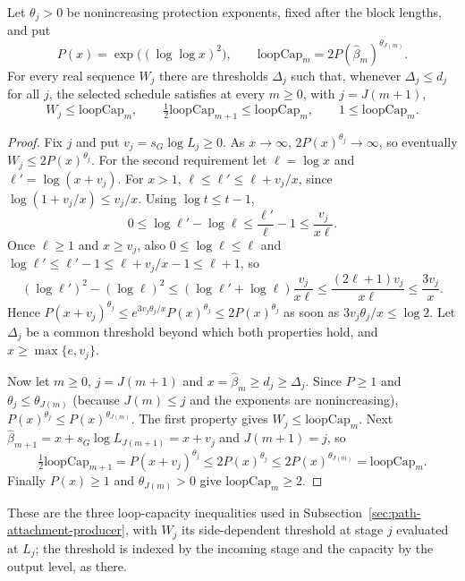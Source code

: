\begin{lemma}\label{lem:common-loop-capacity}
Let $\theta_j>0$ be nonincreasing protection exponents, fixed
after the block lengths, and put
\[
 P(x)=\exp\bigl((\log\log x)^2\bigr),\qquad
 \mathrm{loopCap}_m=2P(\widehat\beta_m)^{\theta_{J(m)}}.
\]
For every real sequence $W_j$ there are thresholds $\Delta_j$ such that,
whenever $\Delta_j\le d_j$ for all $j$, the selected schedule satisfies
at every $m\ge0$, with $j=J(m+1)$,
\begin{equation}\label{eq:common-loop-capacity}
 W_j\le\mathrm{loopCap}_m,\qquad
 \tfrac12\mathrm{loopCap}_{m+1}\le\mathrm{loopCap}_m,\qquad
 1\le\mathrm{loopCap}_m.
\end{equation}
\end{lemma}
\begin{proof}
Fix $j$ and put $v_j=s_G\log L_j\ge0$. As $x\to\infty$,
$2P(x)^{\theta_j}\to\infty$, so eventually $W_j\le2P(x)^{\theta_j}$.
For the second requirement let $\ell=\log x$ and $\ell'=\log(x+v_j)$.
For $x>1$, $\ell\le\ell'\le\ell+v_j/x$, since
$\log(1+v_j/x)\le v_j/x$. Using $\log t\le t-1$,
\[
 0\le\log\ell'-\log\ell\le\frac{\ell'}{\ell}-1\le\frac{v_j}{x\ell}.
\]
Once $\ell\ge1$ and $x\ge v_j$, also $0\le\log\ell\le\ell$ and
$\log\ell'\le\ell'-1\le\ell+v_j/x-1\le\ell+1$, so
\[
 (\log\ell')^2-(\log\ell)^2
   \le(\log\ell'+\log\ell)\frac{v_j}{x\ell}
   \le\frac{(2\ell+1)v_j}{x\ell}\le\frac{3v_j}{x}.
\]
Hence $P(x+v_j)^{\theta_j}\le e^{3v_j\theta_j/x}P(x)^{\theta_j}
\le2P(x)^{\theta_j}$ as soon as $3v_j\theta_j/x\le\log2$. Let
$\Delta_j$ be a common threshold beyond which both properties hold,
and $x\ge\max\{e,v_j\}$.

Now let $m\ge0$, $j=J(m+1)$ and $x=\widehat\beta_m\ge d_j\ge\Delta_j$.
Since $P\ge1$ and $\theta_j\le\theta_{J(m)}$ (because $J(m)\le j$ and
the exponents are nonincreasing),
$P(x)^{\theta_j}\le P(x)^{\theta_{J(m)}}$. The first property gives
$W_j\le\mathrm{loopCap}_m$. Next
$\widehat\beta_{m+1}=x+s_G\log L_{J(m+1)}=x+v_j$ and $J(m+1)=j$, so
\[
 \tfrac12\mathrm{loopCap}_{m+1}=P(x+v_j)^{\theta_j}
   \le2P(x)^{\theta_j}\le2P(x)^{\theta_{J(m)}}=\mathrm{loopCap}_m.
\]
Finally $P(x)\ge1$ and $\theta_{J(m)}>0$ give $\mathrm{loopCap}_m\ge2$.
\end{proof}
These are the three loop-capacity inequalities used in
Subsection~\ref{sec:path-attachment-producer}, with $W_j$ its side-dependent
threshold at stage $j$ evaluated at $L_j$; the threshold is indexed by
the incoming stage and the capacity by the output level, as there.


